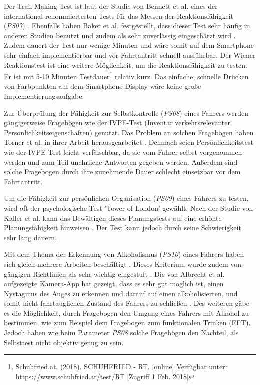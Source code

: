 Der Trail-Making-Test  ist laut der Studie von Bennett et al. eines der international renommiertesten Tests für das Messen der Reaktionsfähigkeit (\textit{PS07}) \cite{cognitivetestsfitnesstodrive}. Ebenfalls haben Baker et al. festgestellt, dass dieser Test sehr häufig in anderen Studien benutzt  und zudem als sehr zuverlässig eingeschätzt wird \cite{reviewofassessmenttests}. Zudem dauert der Test nur wenige Minuten und wäre somit auf dem Smartphone sehr einfach implementierbar und vor Fahrtantritt schnell ausführbar. Der Wiener Reaktionstest ist eine weitere Möglichkeit, um die Reaktionsfähigkeit zu testen. Er ist mit 5-10 Minuten Testdauer\footnote{Schuhfried.at. (2018). SCHUHFRIED - RT. [online] Verfügbar unter: https://www.schuhfried.at/test/RT [Zugriff 1 Feb. 2018]} relativ kurz. Das einfache, schnelle Drücken von Farbpunkten auf dem Smartphone-Display wäre keine große Implementierungsaufgabe.

Zur Überprüfung der Fähigkeit zur Selbstkontrolle (\textit{PS08}) eines Fahrers werden gängigerweise Fragebögen wie der IVPE-Test (Inventar verkehrsrelevanter Persönlichkeitseigenschaften) genutzt. Das Problem an solchen Fragebögen haben Torner et al. in ihrer Arbeit herausgearbeitet \cite{verfalschbarkeitivpe}. Demnach seien Persönlichkeitstest wie der IVPE-Test leicht verfälschbar, da sie vom Fahrer selbst vorgenommen werden und zum Teil unehrliche Antworten gegeben werden. Außerdem sind solche Fragebogen durch ihre zunehmende Dauer schlecht einsetzbar vor dem Fahrtantritt.

Um die Fähigkeit zur persönlichen Organisation (\textit{PS09}) eines Fahrers zu testen, wird oft der psychologische Test 'Tower of London' gewählt. Nach der Studie von Kaller et al. kann das Bewältigen dieses Planungstests auf eine erhöhte Planungsfähigkeit hinweisen \cite{toweroflondon}. Der Test kann jedoch durch seine Schwierigkeit sehr lang dauern.

Mit dem Thema der Erkennung von Alkoholismus (\textit{PS10}) eines Fahrers haben sich gleich mehrere Arbeiten beschäftigt \cite{mobilesmarttracking,sobrietymobiletests}. Dieses Kriterium wurde zudem von gängigen Richtlinien als sehr wichtig eingestuft \cite{begutachtungsrichtlinien,testverfahrenpsychometrischefahreignung,beurteilungskriterien,drivervehiclelicencingagency}. Die von Albrecht et al. aufgezeigte Kamera-App hat gezeigt, dass es sehr gut möglich ist, einen Nystagmus des Auges zu erkennen und darauf auf einen alkoholisierten, und somit nicht fahrtauglichen Zustand des Fahrers zu schließen \cite{mobilesmarttracking}. Des weiteren gäbe es die Möglichkeit, durch Fragebogen den Umgang eines Fahrers mit Alkohol zu bestimmen, wie zum Beispiel dem Fragebogen zum funktionalen Trinken (FFT). Jedoch haben wie beim Parameter \textit{PS08} solche Fragebögen den Nachteil, als Selbsttest nicht objektiv genug zu sein.

